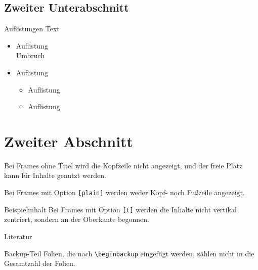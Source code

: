 \documentclass{sdqbeamer}
\begin{document}
\subsection{Zweiter Unterabschnitt}
\begin{frame}{Auflistungen}
  Text
  \begin{itemize}
    \item Auflistung\\ Umbruch
    \item Auflistung
    \begin{itemize}
      \item Auflistung
      \item Auflistung
    \end{itemize}
  \end{itemize}
\end{frame}

\section{Zweiter Abschnitt}

\begin{frame}
        Bei Frames ohne Titel wird die Kopfzeile nicht angezeigt, und  
    der freie Platz kann für Inhalte genutzt werden.
\end{frame}

\begin{frame}[plain]
    Bei Frames mit Option \texttt{[plain]} werden weder Kopf- noch Fußzeile angezeigt.
\end{frame}

\begin{frame}[t]{Beispielinhalt}
    Bei Frames mit Option \texttt{[t]} werden die Inhalte nicht vertikal zentriert, sondern an der Oberkante begonnen.
\end{frame}


\begin{frame}{Literatur}
  \begin{exampleblock}{Backup-Teil}
      Folien, die nach \texttt{\textbackslash beginbackup} eingefügt werden, zählen nicht in die Gesamtzahl der Folien.
  \end{exampleblock}

  \printbibliography
\end{frame}
\end{document}
